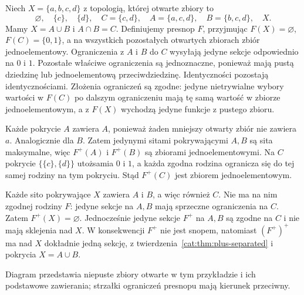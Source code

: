 \begin{przyklad}\label{cat:ex:two-plus-necessary}
Niech $X=\{a,b,c,d\}$ z topologią, której otwarte zbiory to
\[
 \varnothing,\quad \{c\},\quad \{d\},\quad C=\{c,d\},
 \quad A=\{a,c,d\},\quad B=\{b,c,d\},\quad X.
\]
Mamy $X=A\cup B$ i $A\cap B=C$. Definiujemy presnop $F$, przyjmując $F(X)=\varnothing$, $F(C)=\{0,1\}$, a na wszystkich pozostałych otwartych zbiorach zbiór jednoelementowy. Ograniczenia z $A$ i $B$ do $C$ wysyłają jedyne sekcje odpowiednio na $0$ i $1$. Pozostałe właściwe ograniczenia są jednoznaczne, ponieważ mają pustą dziedzinę lub jednoelementową przeciwdziedzinę. Identyczności pozostają identycznościami. Złożenia ograniczeń są zgodne: jedyne nietrywialne wybory wartości w $F(C)$ po dalszym ograniczeniu mają tę samą wartość w zbiorze jednoelementowym, a z $F(X)$ wychodzą jedyne funkcje z pustego zbioru.

Każde pokrycie $A$ zawiera $A$, ponieważ żaden mniejszy otwarty zbiór nie zawiera $a$. Analogicznie dla $B$. Zatem jedynymi sitami pokrywającymi $A,B$ są sita maksymalne, więc $F^+(A)$ i $F^+(B)$ są zbiorami jednoelementowymi. Na $C$ pokrycie $\{\{c\},\{d\}\}$ utożsamia $0$ i $1$, a każda zgodna rodzina ogranicza się do tej samej rodziny na tym pokryciu. Stąd $F^+(C)$ jest zbiorem jednoelementowym.

Każde sito pokrywające $X$ zawiera $A$ i $B$, a więc również $C$. Nie ma na nim zgodnej rodziny $F$: jedyne sekcje na $A,B$ mają sprzeczne ograniczenia na $C$. Zatem $F^+(X)=\varnothing$. Jednocześnie jedyne sekcje $F^+$ na $A,B$ są zgodne na $C$ i nie mają sklejenia nad $X$. W konsekwencji $F^+$ nie jest snopem, natomiast $(F^+)^+$ ma nad $X$ dokładnie jedną sekcję, z twierdzenia~\ref{cat:thm:plus-separated} i pokrycia $X=A\cup B$.
\end{przyklad}

\begin{center}
\end{center}
Diagram przedstawia niepuste zbiory otwarte w tym przykładzie i ich podstawowe zawierania; strzałki ograniczeń presnopu mają kierunek przeciwny.

